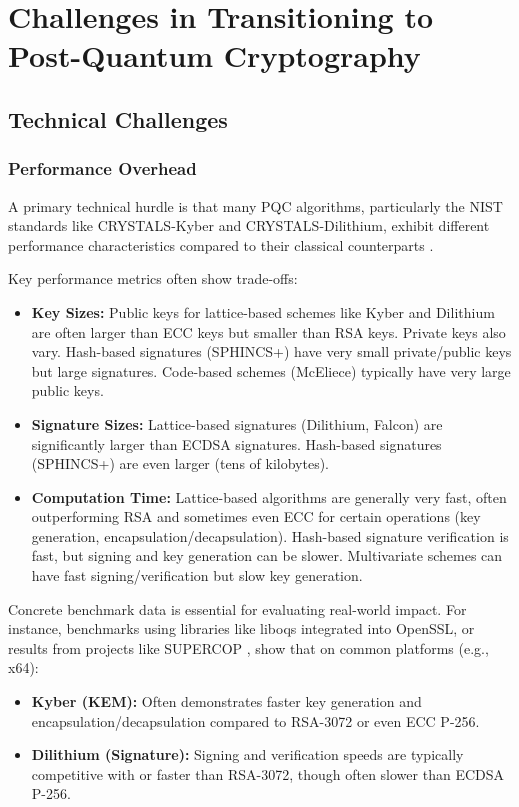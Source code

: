 \chapter{Challenges in Transitioning to Post-Quantum Cryptography}\label{chap:challenges}

\section{Technical Challenges}\label{sec:technical_challenges}

\subsection{Performance Overhead}\label{subsec:performance}
A primary technical hurdle is that many PQC algorithms, particularly the NIST standards like CRYSTALS-Kyber and CRYSTALS-Dilithium, exhibit different performance characteristics compared to their classical counterparts \parencite{bernstein2017post}.

Key performance metrics often show trade-offs:
\begin{itemize}
    \item \textbf{Key Sizes:} Public keys for lattice-based schemes like Kyber and Dilithium are often larger than ECC keys but smaller than RSA keys. Private keys also vary. Hash-based signatures (SPHINCS+) have very small private/public keys but large signatures. Code-based schemes (McEliece) typically have very large public keys.
    \item \textbf{Signature Sizes:} Lattice-based signatures (Dilithium, Falcon) are significantly larger than ECDSA signatures. Hash-based signatures (SPHINCS+) are even larger (tens of kilobytes).
    \item \textbf{Computation Time:} Lattice-based algorithms are generally very fast, often outperforming RSA and sometimes even ECC for certain operations (key generation, encapsulation/decapsulation). Hash-based signature verification is fast, but signing and key generation can be slower. Multivariate schemes can have fast signing/verification but slow key generation.
\end{itemize}

Concrete benchmark data is essential for evaluating real-world impact. For instance, benchmarks using libraries like liboqs integrated into OpenSSL, or results from projects like SUPERCOP \parencite{nist_pqc_benchmarks_supercop}, show that on common platforms (e.g., x64):
\begin{itemize}
    \item \textbf{Kyber (KEM):} Often demonstrates faster key generation and encapsulation/decapsulation compared to RSA-3072 or even ECC P-256.
    \item \textbf{Dilithium (Signature):} Signing and verification speeds are typically competitive with or faster than RSA-3072, though often slower than ECDSA P-256.
\end{itemize}

